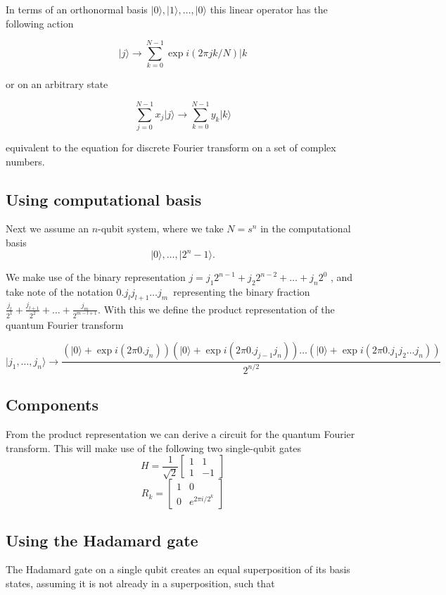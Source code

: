 \documentclass[%
oneside,                 %
final,                   %
10pt]{article}
\begin{document}
In terms of an orthonormal basis $\vert 0 \rangle,\vert 1\rangle,\dots,\vert 0 \rangle$ this linear operator has the following action

\[
\vert j \rangle \rightarrow \sum_{k=0}^{N-1} \exp{i(2\pi jk/N)}\vert k 
\]

 or on an arbitrary state

\[
\sum_{j=0}^{N-1} x_j \vert j \rangle \rightarrow \sum_{k=0}^{N-1} y_k\vert k \rangle
\]

equivalent to the equation for discrete Fourier transform on a set of complex numbers.

\subsection{Using computational basis}

Next we assume an $n$-qubit system, where we take $N=s^n$ in the computational basis 
\[
\vert 0 \rangle,\dots,\vert 2^n -1\rangle.
\]

We make use of the binary representation $j = j_1 2^{n-1} + j_2
2^{n-2} + \dots + j_n 2^0$ , and take note of the notation $0.j_l
j_{l+1} \dots j_m$ representing the binary fraction $\frac{j_l}{2^1} +
\frac{j_{l+1}}{2^{2}} + \dots + \frac{j_m}{2^{m-l+1}}$. With this we
define the product representation of the quantum Fourier transform

\[
\vert j_1,\dots,j_n\rangle  \rightarrow 
\frac{
\left(\vert 0 \rangle + \exp{i(2\pi 0.j_n)}\right)
\left(\vert 0 \rangle + \exp{i(2\pi 0.j_{j-1}j_n)}\right)
\dots
\left(\vert 0 \rangle + \exp{i(2\pi 0.j_1j_2\dots j_n)}\right)
}{2^{n/2}}
\]

\subsection{Components}

From the product representation we can derive a circuit for the
quantum Fourier transform. This will make use of the following two
single-qubit gates
\[
    H = \frac{1}{\sqrt{2}}
    \begin{bmatrix}
        1 & 1 \\
        1 & -1
    \end{bmatrix}
\]
\[
    R_k =
    \begin{bmatrix}
        1 & 0 \\
        0 & e^{2\pi i/2^{k}}
    \end{bmatrix}
\]

\subsection{Using the Hadamard gate}
The Hadamard
gate on a single qubit creates an equal superposition of its basis
states, assuming it is not already in a superposition, such that
\end{document}

